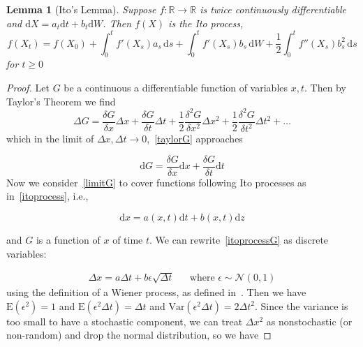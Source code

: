 \documentclass[11pt]{article} %
\newtheorem{lemma}[theorem]{Lemma}
\begin{document}
\begin{lemma}[Ito's Lemma]\label{itolemma}
    Suppose $f: \mathbb{R} \to \mathbb{R}$ is twice continuously differentiable and 
    $\mathrm{d}X = a_t\mathrm{d}t + b_t\mathrm{d}W$. Then $f(X)$ is the Ito process,
    \begin{equation}
        f(X_t)
        = f(X_0) + \int_0^t \! f'(X_s)a_s \, \mathrm{d}s + 
        \int_0^t \! f'(X_s)b_s \, \mathrm{d}W + \frac{1}{2}\int_0^t \! f''(X_s)b_s^2 \,
         \mathrm{d}s
    \end{equation}
    for $t\ge0$
\end{lemma}
\begin{proof}
    Let $G$ be a continuous a differentiable function of variables $x, t$. 
    Then by Taylor's Theorem we find
    \begin{equation}\label{taylorG}
        \Delta G = \frac{\delta G}{\delta x}\Delta x + 
        \frac{\delta G}{\delta t}\Delta t + 
        \frac{1}{2} \frac{\delta^2 G}{\delta x^2}\Delta x^2 + 
        \frac{1}{2} \frac{\delta^2 G}{\delta t^2}\Delta t^2 + \dots
    \end{equation}
    which in the limit of $\Delta x, \Delta t \to 0$,~\eqref{taylorG} approaches

    \begin{equation}\label{limitG}
        \mathrm{d}G = \frac{\delta G}{\delta x}\mathrm{d}x + 
        \frac{\delta G}{\delta t}\mathrm{d}t
    \end{equation}
    Now we consider~\eqref{limitG} to cover functions following Ito processes as 
    in~\eqref{itoprocess}, i.e.,

    \begin{equation}\label{itoprocessG}
        \mathrm{d}x = a(x,t)\mathrm{d}t + b(x,t)\mathrm{d}z
    \end{equation}

    and $G$ is a function of $x$ of time $t$. We can rewrite~\eqref{itoprocessG} 
    as discrete variables:

    \begin{align}
        \Delta x = a\Delta t + b \epsilon \sqrt{\Delta t}
         && \text{where $\epsilon \sim \mathcal{N}(0,1)$}
    \end{align}
using the definition of a Wiener process, as defined in~\cite{optionsderivatives}. 
Then we have $\mathrm{E}(\epsilon^2) = 1$  and $\mathrm{E}(\epsilon^2  \Delta t) =
 \Delta t$ and $\mathrm{Var}(\epsilon^2  \Delta t) = 2\Delta t ^2$. Since the variance 
 is too small to have a stochastic component, we can treat $\Delta x ^2$ as nonstochastic 
(or non-random) and drop the normal distribution, so we have 


\end{proof}
\end{document}
